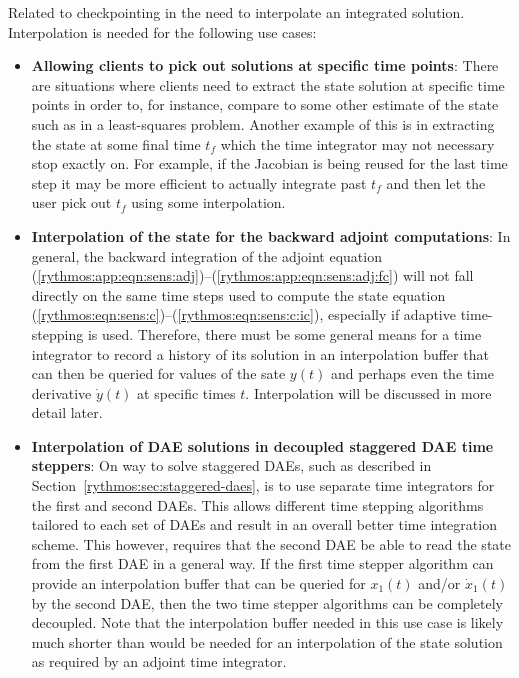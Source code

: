 \documentclass[pdf,ps2pdf,11pt]{SANDreport}
\begin{document}
Related to checkpointing in the need to interpolate an integrated solution.
Interpolation is needed for the following use cases:
%
\begin{itemize}
%
{}\item {}\textbf{Allowing clients to pick out solutions at specific time
points}: There are situations where clients need to extract the state solution
at specific time points in order to, for instance, compare to some other
estimate of the state such as in a least-squares problem.  Another example of
this is in extracting the state at some final time $t_f$ which the time
integrator may not necessary stop exactly on.  For example, if the Jacobian is
being reused for the last time step it may be more efficient to actually
integrate past $t_f$ and then let the user pick out $t_f$ using some
interpolation.
%
{}\item {}\textbf{Interpolation of the state for the backward adjoint
computations}: In general, the backward integration of the adjoint equation
(\ref{rythmos:app:eqn:sens:adj})--(\ref{rythmos:app:eqn:sens:adj:fc}) will not
fall directly on the same time steps used to compute the state equation
(\ref{rythmos:eqn:sens:c})--(\ref{rythmos:eqn:sens:c:ic}), especially if
adaptive time-stepping is used.  Therefore, there must be some general means
for a time integrator to record a history of its solution in an interpolation
buffer that can then be queried for values of the sate $y(t)$ and perhaps even
the time derivative $\dot{y}(t)$ at specific times $t$.  Interpolation will be
discussed in more detail later.
%
{}\item {}\textbf{Interpolation of DAE solutions in decoupled staggered DAE
time steppers}: On way to solve staggered DAEs, such as described in
Section~\ref{rythmos:sec:staggered-daes}, is to use separate time integrators
for the first and second DAEs.  This allows different time stepping algorithms
tailored to each set of DAEs and result in an overall better time integration
scheme.  This however, requires that the second DAE be able to read the state
from the first DAE in a general way.  If the first time stepper algorithm can
provide an interpolation buffer that can be queried for $x_1(t)$ and/or
$\dot{x}_1(t)$ by the second DAE, then the two time stepper algorithms can be
completely decoupled.  Note that the interpolation buffer needed in this use
case is likely much shorter than would be needed for an interpolation of the
state solution as required by an adjoint time integrator.
%
\end{itemize}
\end{document}
